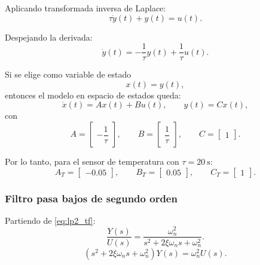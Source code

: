 \documentclass[12pt, a4paper,journal, onecolumn, compsoc]{IEEEtran}
\begin{document}
Aplicando transformada inversa de Laplace:
\begin{equation}
    \tau \dot{y}(t)+y(t)=u(t).
\end{equation}

Despejando la derivada:
\begin{equation}
    \dot{y}(t)=-\frac{1}{\tau}y(t)+\frac{1}{\tau}u(t).
\end{equation}

Si se elige como variable de estado
\begin{equation}
    x(t)=y(t),
\end{equation}
entonces el modelo en espacio de estados queda:
\begin{equation}
    \dot{x}(t)=Ax(t)+Bu(t), \qquad y(t)=Cx(t),
\end{equation}
con
\begin{equation}
    A=\begin{bmatrix}
        -\dfrac{1}{\tau}
    \end{bmatrix},
    \qquad
    B=\begin{bmatrix}
        \dfrac{1}{\tau}
    \end{bmatrix},
    \qquad
    C=\begin{bmatrix}
        1
    \end{bmatrix}.
\end{equation}

Por lo tanto, para el sensor de temperatura con $\tau=20\ \text{s}$:
\begin{equation}
    A_T=\begin{bmatrix}
        -0.05
    \end{bmatrix},
    \qquad
    B_T=\begin{bmatrix}
        0.05
    \end{bmatrix},
    \qquad
    C_T=\begin{bmatrix}
        1
    \end{bmatrix}.
\end{equation}

\subsubsection*{Filtro pasa bajos de segundo orden}

Partiendo de \eqref{eq:lp2_tf}:
\begin{equation}
    \frac{Y(s)}{U(s)}=\frac{\omega_n^2}{s^2+2\xi\omega_n s+\omega_n^2}.
\end{equation}
\begin{equation}
    (s^2+2\xi\omega_n s+\omega_n^2)Y(s)=\omega_n^2 U(s).
\end{equation}
\end{document}
